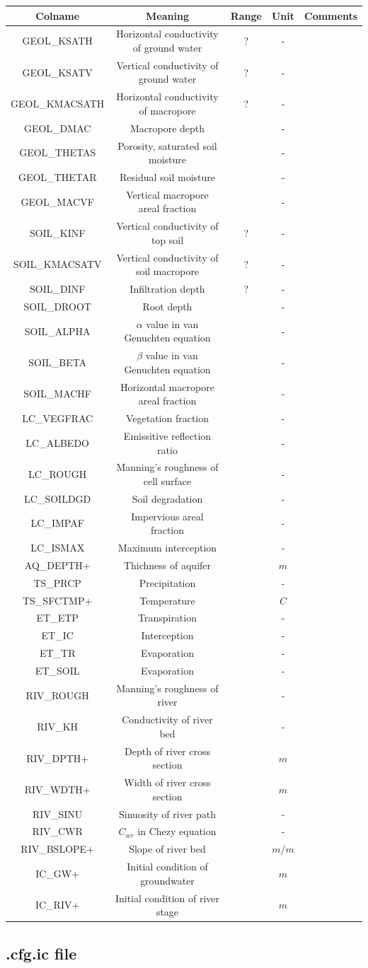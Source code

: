 \documentclass[
]{scrbook}
\begin{document}
\begin{longtable}[]{@{}ccccc@{}}
\toprule
Colname & Meaning & Range & Unit & Comments\tabularnewline
\midrule
\endhead
GEOL\_KSATH & Horizontal conductivity of ground water & ? & - &\tabularnewline
GEOL\_KSATV & Vertical conductivity of ground water & ? & - &\tabularnewline
GEOL\_KMACSATH & Horizontal conductivity of macropore & ? & - &\tabularnewline
GEOL\_DMAC & Macropore depth & & - &\tabularnewline
GEOL\_THETAS & Porosity, saturated soil moisture & & - &\tabularnewline
GEOL\_THETAR & Residual soil moisture & & - &\tabularnewline
GEOL\_MACVF & Vertical macropore areal fraction & & - &\tabularnewline
SOIL\_KINF & Vertical conductivity of top soil & ? & - &\tabularnewline
SOIL\_KMACSATV & Vertical conductivity of soil macropore & ? & - &\tabularnewline
SOIL\_DINF & Infiltration depth & ? & - &\tabularnewline
SOIL\_DROOT & Root depth & & - &\tabularnewline
SOIL\_ALPHA & \(\alpha\) value in van Genuchten equation & & - &\tabularnewline
SOIL\_BETA & \(\beta\) value in van Genuchten equation & & - &\tabularnewline
SOIL\_MACHF & Horizontal macropore areal fraction & & - &\tabularnewline
LC\_VEGFRAC & Vegetation fraction & & - &\tabularnewline
LC\_ALBEDO & Emissitive reflection ratio & & - &\tabularnewline
LC\_ROUGH & Manning's roughness of cell surface & & - &\tabularnewline
LC\_SOILDGD & Soil degradation & & - &\tabularnewline
LC\_IMPAF & Impervious areal fraction & & - &\tabularnewline
LC\_ISMAX & Maximum interception & & - &\tabularnewline
AQ\_DEPTH+ & Thichness of aquifer & & \(m\) &\tabularnewline
TS\_PRCP & Precipitation & & - &\tabularnewline
TS\_SFCTMP+ & Temperature & & \(C\) &\tabularnewline
ET\_ETP & Transpiration & & - &\tabularnewline
ET\_IC & Interception & & - &\tabularnewline
ET\_TR & Evaporation & & - &\tabularnewline
ET\_SOIL & Evaporation & & - &\tabularnewline
RIV\_ROUGH & Manning's roughness of river & & - &\tabularnewline
RIV\_KH & Conductivity of river bed & & - &\tabularnewline
RIV\_DPTH+ & Depth of river cross section & & \(m\) &\tabularnewline
RIV\_WDTH+ & Width of river cross section & & \(m\) &\tabularnewline
RIV\_SINU & Sinuosity of river path & & - &\tabularnewline
RIV\_CWR & \(C_{wr}\) in Chezy equation & & - &\tabularnewline
RIV\_BSLOPE+ & Slope of river bed & & \(m/m\) &\tabularnewline
IC\_GW+ & Initial condition of groundwater & & \(m\) &\tabularnewline
IC\_RIV+ & Initial condition of river stage & & \(m\) &\tabularnewline
\bottomrule
\end{longtable}

\hypertarget{cfg.ic-file}{%
\subsection{.cfg.ic file}\label{cfg.ic-file}}
\end{document}
